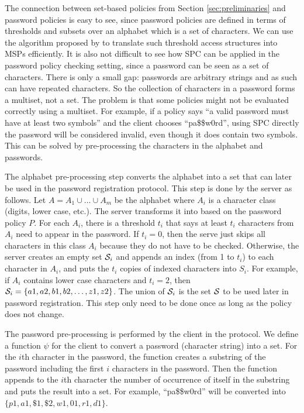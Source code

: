 The connection between set-based policies from Section \ref{sec:preliminaries} and password policies is easy to see, since password policies are defined in terms of thresholds and subsets over an alphabet which is a set of characters.
 We can use the algorithm proposed by \citet{LiuC10} to translate such threshold access structures into MSPs efficiently. 
 It is also not difficult to see how SPC can be applied in the password policy checking setting, since a password can be seen as a set of characters. 
There is only a small gap: passwords are arbitrary strings and as such can have repeated characters. 
So the collection of characters in a password forms a multiset, not a set. 
The problem is that some policies might not be evaluated correctly using a multiset. 
For example, if a policy says ``a valid password must have at least two symbols'' and the client chooses ``pa\$\$w0rd'', using SPC directly the password will be considered invalid, even though it does contain two symbols. 
This can be solved by pre-processing the characters in the alphabet and passwords.

The alphabet pre-processing step converts the alphabet into a set that can later be used in the password registration protocol. 
This step is done by the server as follows. Let $A=A_1\cup\dots\cup A_m$ be the alphabet where $A_i$ is a character class (digits, lower case, etc.). The server transforms it into \cS based on the password policy $P$. 
For each $A_i$, there is a threshold $t_i$ that says at least $t_i$ characters from $A_i$ need to appear in the password. 
If $t_i = 0$, then the serve just skips all characters in this class $A_i$ because they do not have to be checked. 
Otherwise, the server creates an empty set $\mathcal{S}_i$ and appends an index (from 1 to $t_i$) to each character in $A_i$, and puts the $t_i$ copies of indexed characters into $S_i$. For example, if $A_i$ contains lower case characters and $t_i=2$, then $\mathcal{S}_i=\{a1,a2,b1,b2,\ldots,z1,z2\}$. 
The union of $\mathcal{S}_i$ is the set $\mathcal{S}$ to be used later in password registration. This step only need to be done once as long as the policy does not change.

The password pre-processing is performed by the client in the protocol. We define a function $\psi$ for the client to convert a password (character string) into a set. For the $i$th character in the password, the function creates a substring of the password including the first $i$ characters in the password. Then the function appends to the $i$th character the number of occurrence of itself in the substring and puts the result into a set. For example, ``pa\$\$w0rd'' will be converted into $\{p1,a1,\$1,\$2,w1,01,r1,d1\}$. 
 


